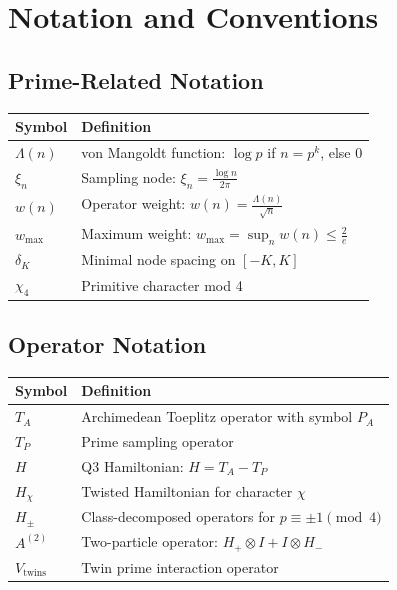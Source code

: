 \appendix

\section{Notation and Conventions}\label{app:notation}

\subsection{Prime-Related Notation}

\begin{tabular}{ll}
\toprule
\textbf{Symbol} & \textbf{Definition} \\
\midrule
$\Lambda(n)$ & von Mangoldt function: $\log p$ if $n = p^k$, else $0$ \\
$\xi_n$ & Sampling node: $\xi_n = \frac{\log n}{2\pi}$ \\
$w(n)$ & Operator weight: $w(n) = \frac{\Lambda(n)}{\sqrt{n}}$ \\
$w_{\max}$ & Maximum weight: $w_{\max} = \sup_n w(n) \leq \frac{2}{e}$ \\
$\delta_K$ & Minimal node spacing on $[-K, K]$ \\
$\chi_4$ & Primitive character mod 4 \\
\bottomrule
\end{tabular}

\subsection{Operator Notation}

\begin{tabular}{ll}
\toprule
\textbf{Symbol} & \textbf{Definition} \\
\midrule
$T_A$ & Archimedean Toeplitz operator with symbol $P_A$ \\
$T_P$ & Prime sampling operator \\
$H$ & Q3 Hamiltonian: $H = T_A - T_P$ \\
$H_\chi$ & Twisted Hamiltonian for character $\chi$ \\
$H_\pm$ & Class-decomposed operators for $p \equiv \pm 1 \pmod{4}$ \\
$A^{(2)}$ & Two-particle operator: $H_+ \otimes I + I \otimes H_-$ \\
$V_{\mathrm{twins}}$ & Twin prime interaction operator \\
\bottomrule
\end{tabular}

